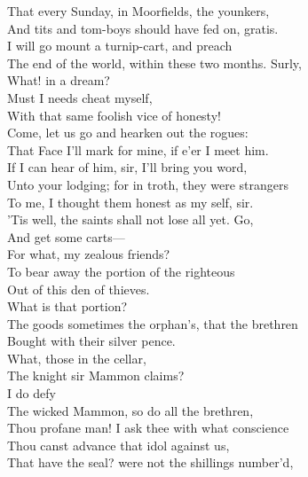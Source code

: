 \documentclass[a4paper,oneside]{memoir}
\begin{document}
\begin{drama*}
That every Sunday, in Moorfields, the younkers,\\
And tits and tom-boys should have fed on, gratis.\\
\mammonspeaks I will go mount a turnip-cart, and preach\\
The end of the world, within these two months. Surly,\\
What! in a dream?\\
\surlyspeaks {} Must I needs cheat myself,\\
With that same foolish vice of honesty!\\
Come, let us go and hearken out the rogues:\\
That Face I'll mark for mine, if e'er I meet him.\\
\facespeaks If I can hear of him, sir, I'll bring you word,\\
Unto your lodging; for in troth, they were strangers\\
To me, I thought them honest as my self, sir.\\
\tribulationspeaks 'Tis well, the saints shall not lose all yet. Go,\\
And get some carts---\\
\lovewitspeaks {} For what, my zealous friends?\\
\ananiasspeaks To bear away the portion of the righteous\\
Out of this den of thieves.\\
\lovewitspeaks {} What is that portion?\\
\ananiasspeaks The goods sometimes the orphan's, that the brethren\\
Bought with their silver pence.\\
\lovewitspeaks {} What, those in the cellar,\\
The knight sir Mammon claims?\\
\ananiasspeaks {} I do defy\\
The wicked Mammon, so do all the brethren,\\
Thou profane man! I ask thee with what conscience\\
Thou canst advance that idol against us,\\
That have the seal? were not the shillings number'd,\\

\end{drama*}
\end{document}
